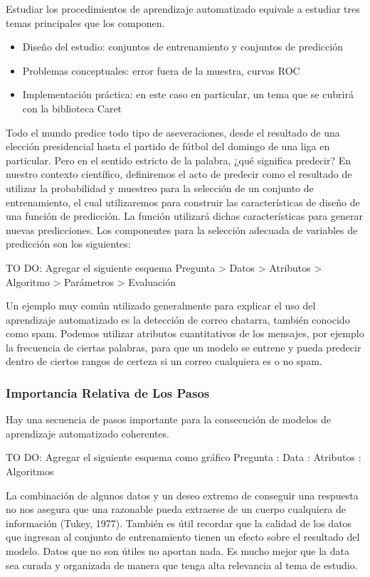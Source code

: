 \documentclass[letterpaper, spanish, 11pt]{report}
\begin{document}
Estudiar los procedimientos de aprendizaje automatizado equivale a estudiar tres temas principales que los componen.

\begin{itemize}
	\item Diseño del estudio: conjuntos de entrenamiento y conjuntos de predicción
	\item Problemas conceptuales: error fuera de la muestra, curvas ROC
	\item Implementación práctica: en este caso en particular, un tema que se cubrirá con la biblioteca Caret
\end{itemize}

Todo el mundo predice todo tipo de aseveraciones, desde el resultado de una elección presidencial hasta el partido de fútbol del domingo de una liga en particular. Pero en el sentido estricto de la palabra, ¿qué significa predecir? En nuestro contexto científico, definiremos el acto de predecir como el resultado de utilizar la probabilidad y muestreo para la selección de un conjunto de entrenamiento, el cual utilizaremos para construir las características de diseño de una función de predicción. La función utilizará dichas características para generar nuevas predicciones.  Los componentes para la selección adecuada de variables de predicción son los siguientes:

TO DO: Agregar el siguiente esquema
Pregunta > Datos > Atributos > Algoritmo > Parámetros > Evaluación

Un ejemplo muy común utilizado generalmente para explicar el uso del aprendizaje automatizado es la detección de correo chatarra, también conocido como spam. Podemos utilizar atributos cuantitativos de los mensajes, por ejemplo la frecuencia de ciertas palabras, para que un modelo se entrene y pueda predecir dentro de ciertos rangos de certeza si un correo cualquiera es o no spam.

\subsubsection{Importancia Relativa de Los Pasos}

Hay una secuencia de pasos importante para la consecución de modelos de aprendizaje automatizado coherentes.

TO DO: Agregar el siguiente esquema como gráfico
Pregunta : Data : Atributos : Algoritmos

La combinación de algunos datos y un deseo extremo de conseguir una respuesta no nos asegura que una razonable pueda extraerse de un cuerpo cualquiera de información (Tukey, 1977). También es útil recordar que la calidad de los datos que ingresan al conjunto de entrenamiento tienen un efecto sobre el resultado del modelo. Datos que no son útiles no aportan nada. Es mucho mejor que la data sea curada y organizada de manera que tenga alta relevancia al tema de estudio.
\end{document}

